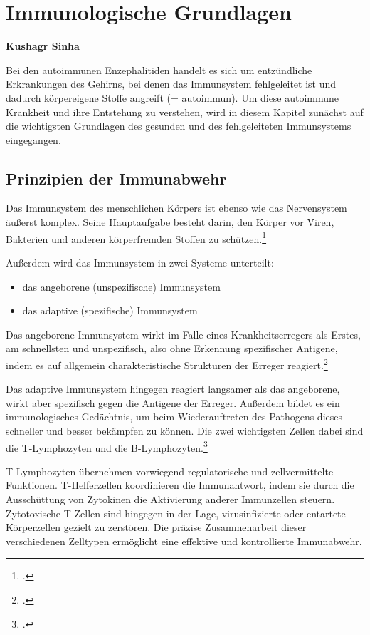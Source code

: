 \section{Immunologische Grundlagen}
\textbf{Kushagr Sinha}


Bei den autoimmunen Enzephalitiden handelt es sich um entzündliche Erkrankungen des Gehirns, bei denen das Immunsystem fehlgeleitet ist und dadurch körpereigene Stoffe angreift (= autoimmun). Um diese autoimmune Krankheit und ihre Entstehung zu verstehen, wird in diesem Kapitel zunächst auf die wichtigsten Grundlagen des gesunden und des fehlgeleiteten Immunsystems eingegangen.
\subsection{Prinzipien der Immunabwehr}

Das Immunsystem des menschlichen Körpers ist ebenso wie das Nervensystem äußerst komplex. Seine Hauptaufgabe besteht darin, den Körper vor Viren, Bakterien und anderen körperfremden Stoffen zu schützen.\footcite{Smith1999}

Außerdem wird das Immunsystem in zwei Systeme unterteilt:
\begin{itemize}
	\item das angeborene (unspezifische) Immunsystem
	\item das adaptive (spezifische) Immunsystem
\end{itemize}

Das angeborene Immunsystem wirkt im Falle eines Krankheitserregers als Erstes, am schnellsten und unspezifisch, also ohne Erkennung spezifischer Antigene, indem es auf allgemein charakteristische Strukturen der Erreger reagiert.\footcite{MSDImmunsystem2026}

Das adaptive Immunsystem hingegen reagiert langsamer als das angeborene, wirkt aber spezifisch gegen die Antigene der Erreger. Außerdem bildet es ein immunologisches Gedächtnis, um beim Wiederauftreten des Pathogens dieses schneller und besser bekämpfen zu können. Die zwei wichtigsten Zellen dabei sind die T-Lymphozyten und die B-Lymphozyten.\footcite{MSDImmunsystem2026}

T-Lymphozyten übernehmen vorwiegend regulatorische und zellvermittelte Funktionen. T-Helferzellen koordinieren die Immunantwort, indem sie durch die Ausschüttung von Zytokinen die Aktivierung anderer Immunzellen steuern. Zytotoxische T-Zellen sind hingegen in der Lage, virusinfizierte oder entartete Körperzellen gezielt zu zerstören. Die präzise Zusammenarbeit dieser verschiedenen Zelltypen ermöglicht eine effektive und kontrollierte Immunabwehr.

